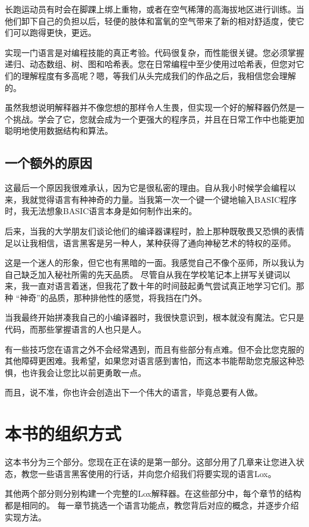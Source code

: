 \documentclass[cn,11pt,chinese]{elegantbook}
\begin{document}
长跑运动员有时会在脚踝上绑上重物，或者在空气稀薄的高海拔地区进行训练。当他们卸下自己的负担以后，轻便的肢体和富氧的空气带来了新的相对舒适度，使它们可以跑得更快，更远。

实现一门语言是对编程技能的真正考验。代码很复杂，而性能很关键。您必须掌握递归、动态数组、树、图和哈希表。您在日常编程中至少使用过哈希表，但您对它们的理解程度有多高呢？嗯，等我们从头完成我们的作品之后，我相信您会理解的。

虽然我想说明解释器并不像您想的那样令人生畏，但实现一个好的解释器仍然是一个挑战。学会了它，您就会成为一个更强大的程序员，并且在日常工作中也能更加聪明地使用数据结构和算法。

\subsection{一个额外的原因}

这最后一个原因我很难承认，因为它是很私密的理由。自从我小时候学会编程以来，我就觉得语言有种神奇的力量。当我第一次一个键一个键地输入BASIC程序时，我无法想象BASIC语言本身是如何制作出来的。

后来，当我的大学朋友们谈论他们的编译器课程时，脸上那种既敬畏又恐惧的表情足以让我相信，语言黑客是另一种人，某种获得了通向神秘艺术的特权的巫师。

这是一个迷人的形象，但它也有黑暗的一面。我感觉自己不像个巫师，所以我认为自己缺乏加入秘社所需的先天品质。 尽管自从我在学校笔记本上拼写关键词以来，我一直对语言着迷，但我花了数十年的时间鼓起勇气尝试真正地学习它们。那种 “神奇”的品质，那种排他性的感觉，将我挡在门外。

当我最终开始拼凑我自己的小编译器时，我很快意识到，根本就没有魔法。它只是代码，而那些掌握语言的人也只是人。

有一些技巧您在语言之外不会经常遇到，而且有些部分有点难。但不会比您克服的其他障碍更困难。我希望，如果您对语言感到害怕，而这本书能帮助您克服这种恐惧，也许我会让您比以前更勇敢一点。

而且，说不准，你也许会创造出下一个伟大的语言，毕竟总要有人做。

\section{本书的组织方式}

这本书分为三个部分。您现在正在读的是第一部分。这部分用了几章来让您进入状态，教您一些语言黑客使用的行话，并向您介绍我们将要实现的语言Lox。

其他两个部分则分别构建一个完整的Lox解释器。在这些部分中，每个章节的结构都是相同的。 每一章节挑选一个语言功能点，教您背后对应的概念，并逐步介绍实现方法。
\end{document}
